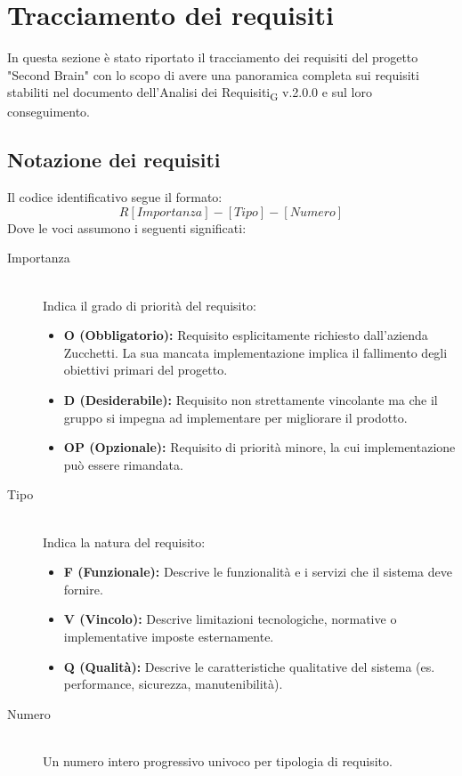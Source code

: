 \documentclass[11pt,a4paper]{article}
\newcommand{\gls}[1]{#1\textsubscript{G}}
\begin{document}
\newpage

\section{Tracciamento dei requisiti}
In questa sezione è stato riportato il tracciamento dei requisiti del progetto "Second Brain" con lo scopo di avere una panoramica completa sui requisiti stabiliti nel documento dell'\gls{Analisi dei Requisiti} v.2.0.0 e sul loro conseguimento.

\subsection{Notazione dei requisiti}
Il codice identificativo segue il formato:
\[
R[Importanza]-[Tipo]-[Numero]
\]
Dove le voci assumono i seguenti significati:

\begin{description}
    \item[Importanza] \hfill \\
    Indica il grado di priorità del requisito:
    \begin{itemize}
        \item \textbf{O (Obbligatorio):} Requisito esplicitamente richiesto dall'azienda Zucchetti. La sua mancata implementazione implica il fallimento degli obiettivi primari del progetto.
        \item \textbf{D (Desiderabile):} Requisito non strettamente vincolante ma che il gruppo si impegna ad implementare per migliorare il prodotto.
        \item \textbf{OP (Opzionale):} Requisito di priorità minore, la cui implementazione può essere rimandata.
    \end{itemize}
    
    \item[Tipo] \hfill \\
    Indica la natura del requisito:
    \begin{itemize}
        \item \textbf{F (Funzionale):} Descrive le funzionalità e i servizi che il sistema deve fornire.
        \item \textbf{V (Vincolo):} Descrive limitazioni tecnologiche, normative o implementative imposte esternamente.
        \item \textbf{Q (Qualità):} Descrive le caratteristiche qualitative del sistema (es. performance, sicurezza, manutenibilità).
    \end{itemize}
    
    \item[Numero] \hfill \\
    Un numero intero progressivo univoco per tipologia di requisito.
\end{description}
\end{document}
